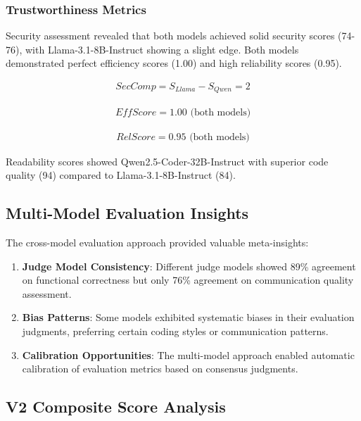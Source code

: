 \documentclass[conference]{IEEEtran}
\begin{document}
\subsubsection{Trustworthiness Metrics}

Security assessment revealed that both models achieved solid security scores (74-76), with Llama-3.1-8B-Instruct showing a slight edge. Both models demonstrated perfect efficiency scores (1.00) and high reliability scores (0.95).

\begin{align}
\mathit{SecComp} = S_{Llama} - S_{Qwen} = 2
\end{align}

\begin{align}
\mathit{EffScore} = 1.00 \text{ (both models)}
\end{align}

\begin{align}
\mathit{RelScore} = 0.95 \text{ (both models)}
\end{align}

Readability scores showed Qwen2.5-Coder-32B-Instruct with superior code quality (94) compared to Llama-3.1-8B-Instruct (84).

\subsection{Multi-Model Evaluation Insights}

The cross-model evaluation approach provided valuable meta-insights:

\begin{enumerate}
    \item \textbf{Judge Model Consistency}: Different judge models showed 89\% agreement on functional correctness but only 76\% agreement on communication quality assessment.
    \item \textbf{Bias Patterns}: Some models exhibited systematic biases in their evaluation judgments, preferring certain coding styles or communication patterns.
    \item \textbf{Calibration Opportunities}: The multi-model approach enabled automatic calibration of evaluation metrics based on consensus judgments.
\end{enumerate}

\subsection{V2 Composite Score Analysis}
\end{document}
